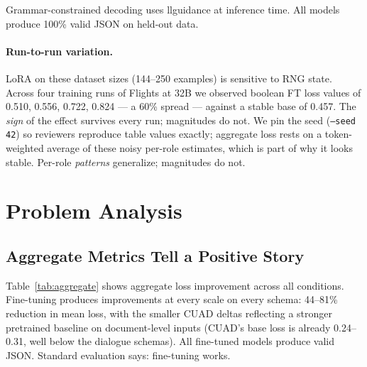 \documentclass{article}
\begin{document}
Grammar-constrained decoding uses llguidance \cite{guidance2024} at inference time. All models produce 100\% valid JSON on held-out data.

\paragraph{Run-to-run variation.} LoRA on these dataset sizes (144--250 examples) is sensitive to RNG state. Across four training runs of Flights at 32B we observed boolean FT loss values of 0.510, 0.556, 0.722, 0.824 --- a 60\% spread --- against a stable base of 0.457. The \emph{sign} of the effect survives every run; magnitudes do not. We pin the seed (\texttt{--seed 42}) so reviewers reproduce table values exactly; aggregate loss rests on a token-weighted average of these noisy per-role estimates, which is part of why it looks stable. Per-role \emph{patterns} generalize; magnitudes do not.

\section{Problem Analysis}

\subsection{Aggregate Metrics Tell a Positive Story}

Table~\ref{tab:aggregate} shows aggregate loss improvement across all conditions. Fine-tuning produces improvements at every scale on every schema: 44--81\% reduction in mean loss, with the smaller CUAD deltas reflecting a stronger pretrained baseline on document-level inputs (CUAD's base loss is already 0.24--0.31, well below the dialogue schemas). All fine-tuned models produce valid JSON. Standard evaluation says: fine-tuning works.
\end{document}
